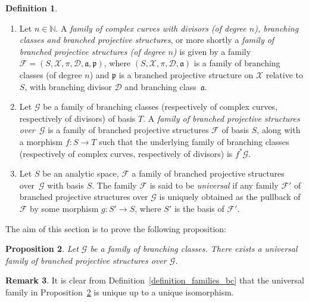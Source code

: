 \documentclass[10pt]{amsart}
\newcommand{\skpt}{\par\smallskip}
\newcommand{\N}{\mathbb N}
\theoremstyle{definition}
\newtheorem{definition}{Definition}[subsection]
\newtheorem{remark}[definition]{Remark}
\theoremstyle{plain}
\newtheorem{proposition}[definition]{Proposition}
\begin{document}
\skpt
\begin{definition}\label{definition_families_bps}
\begin{enumerate}
\item
Let $n \in \N$.
A \emph{family of complex curves with divisors (of degree $n$), branching classes and branched projective structures}, or more shortly a \emph{family of branched projective structures (of degree $n$)} is given by a family $\mathcal F = (S, \mathcal X, \pi, \mathcal D, \mathfrak a, \mathfrak p)$, where $(S, \mathcal X, \pi, \mathcal D, \mathfrak a)$ is a family of branching classes (of degree $n$) and $\mathfrak p$ is a branched projective structure on $\mathcal X$ relative to $S$, with branching divisor $\mathcal D$ and branching class~$\mathfrak a$.
\item
Let $\mathcal G$ be a family of branching classes (respectively of complex curves, respectively of divisors) of basis $T$.
A \emph{family of branched projective structures over~$\mathcal G$} is a family of branched projective structures $\mathcal F$ of basis $S$, along with a morphism $f: S \to T$ such that the underlying family of branching classes (respectively of complex curves, respectively of divisors) is $f^*\mathcal G$.
\item
Let $S$ be an analytic space, $\mathcal F$ a family of branched projective structures over~$\mathcal G$ with basis $S$.
The family $\mathcal F$ is said to be \emph{universal} if any family $\mathcal F'$ of branched projective structures over $\mathcal G$ is uniquely obtained as the pullback of $\mathcal F$ by some morphism $g: S' \to S$, where $S'$ is the basis of $\mathcal F'$.
\end{enumerate}
\end{definition}

The aim of this section is to prove the following proposition:

\begin{proposition}\label{proposition_universal_family_bps_over_bc}
Let $\mathcal G$ be a family of branching classes. There exists a universal family of branched projective structures over $\mathcal G$.
\end{proposition}

\begin{remark}
It is clear from Definition~\ref{definition_families_bc} that the universal family in Proposition~\ref{proposition_universal_family_bps_over_bc} is unique up to a unique isomorphism.
\end{remark}
\end{document}
